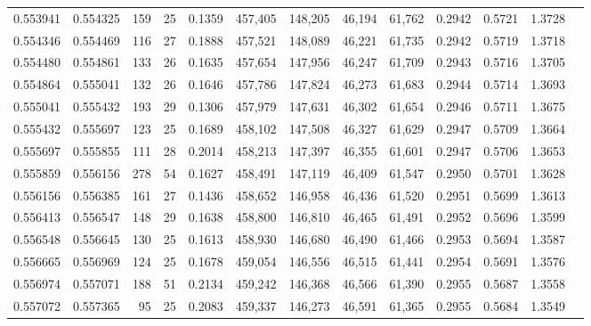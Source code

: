 \begin{tabular}{rrrrrrrrrrrrr}
0.553941 & 0.554325 &   159 &  25 &                                     0.1359 & 457,405 & 148,205 &  46,194 &  61,762 & 0.2942 & 0.5721 & 1.3728 \\
0.554346 & 0.554469 &   116 &  27 &                                     0.1888 & 457,521 & 148,089 &  46,221 &  61,735 & 0.2942 & 0.5719 & 1.3718 \\
0.554480 & 0.554861 &   133 &  26 &                                     0.1635 & 457,654 & 147,956 &  46,247 &  61,709 & 0.2943 & 0.5716 & 1.3705 \\
0.554864 & 0.555041 &   132 &  26 &                                     0.1646 & 457,786 & 147,824 &  46,273 &  61,683 & 0.2944 & 0.5714 & 1.3693 \\
0.555041 & 0.555432 &   193 &  29 &                                     0.1306 & 457,979 & 147,631 &  46,302 &  61,654 & 0.2946 & 0.5711 & 1.3675 \\
0.555432 & 0.555697 &   123 &  25 &                                     0.1689 & 458,102 & 147,508 &  46,327 &  61,629 & 0.2947 & 0.5709 & 1.3664 \\
0.555697 & 0.555855 &   111 &  28 &                                     0.2014 & 458,213 & 147,397 &  46,355 &  61,601 & 0.2947 & 0.5706 & 1.3653 \\
0.555859 & 0.556156 &   278 &  54 &                                     0.1627 & 458,491 & 147,119 &  46,409 &  61,547 & 0.2950 & 0.5701 & 1.3628 \\
0.556156 & 0.556385 &   161 &  27 &                                     0.1436 & 458,652 & 146,958 &  46,436 &  61,520 & 0.2951 & 0.5699 & 1.3613 \\
0.556413 & 0.556547 &   148 &  29 &                                     0.1638 & 458,800 & 146,810 &  46,465 &  61,491 & 0.2952 & 0.5696 & 1.3599 \\
0.556548 & 0.556645 &   130 &  25 &                                     0.1613 & 458,930 & 146,680 &  46,490 &  61,466 & 0.2953 & 0.5694 & 1.3587 \\
0.556665 & 0.556969 &   124 &  25 &                                     0.1678 & 459,054 & 146,556 &  46,515 &  61,441 & 0.2954 & 0.5691 & 1.3576 \\
0.556974 & 0.557071 &   188 &  51 &                                     0.2134 & 459,242 & 146,368 &  46,566 &  61,390 & 0.2955 & 0.5687 & 1.3558 \\
0.557072 & 0.557365 &    95 &  25 &                                     0.2083 & 459,337 & 146,273 &  46,591 &  61,365 & 0.2955 & 0.5684 & 1.3549 \\

\end{tabular}

